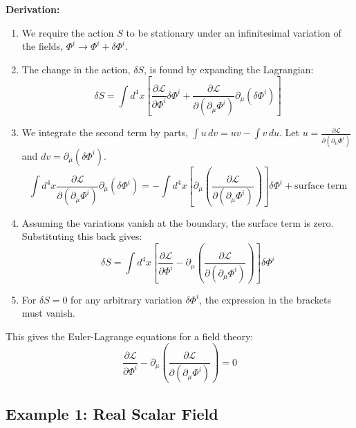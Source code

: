 \documentclass[11pt, a4paper]{report}
\begin{document}
\textbf{Derivation:}
\begin{enumerate}
    \item We require the action $S$ to be stationary under an infinitesimal variation of the fields, $\Phi^i \to \Phi^i + \delta\Phi^i$.
    \item The change in the action, $\delta S$, is found by expanding the Lagrangian:
    \[
        \delta S = \int d^4x \left[ \frac{\partial\mathcal{L}}{\partial\Phi^i}\delta\Phi^i + \frac{\partial\mathcal{L}}{\partial(\partial_\mu\Phi^i)}\partial_\mu(\delta\Phi^i) \right]
    \]
    \item We integrate the second term by parts, $\int u \, dv = uv - \int v \, du$. Let $u = \frac{\partial\mathcal{L}}{\partial(\partial_\mu\Phi^i)}$ and $dv = \partial_\mu(\delta\Phi^i)$.
    \[
        \int d^4x \frac{\partial\mathcal{L}}{\partial(\partial_\mu\Phi^i)}\partial_\mu(\delta\Phi^i) = - \int d^4x \left[\partial_\mu\left(\frac{\partial\mathcal{L}}{\partial(\partial_\mu\Phi^i)}\right)\right] \delta\Phi^i + \text{surface term}
    \]
    \item Assuming the variations vanish at the boundary, the surface term is zero. Substituting this back gives:
    \[
        \delta S = \int d^4x \left[ \frac{\partial\mathcal{L}}{\partial\Phi^i} - \partial_\mu\left(\frac{\partial\mathcal{L}}{\partial(\partial_\mu\Phi^i)}\right) \right] \delta\Phi^i
    \]
    \item For $\delta S = 0$ for any arbitrary variation $\delta\Phi^i$, the expression in the brackets must vanish.
\end{enumerate}
This gives the Euler-Lagrange equations for a field theory:
\begin{equation}
    \frac{\partial\mathcal{L}}{\partial\Phi^i} - \partial_\mu\left(\frac{\partial\mathcal{L}}{\partial(\partial_\mu\Phi^i)}\right) = 0
\end{equation}

\subsection*{Example 1: Real Scalar Field}
\end{document}
